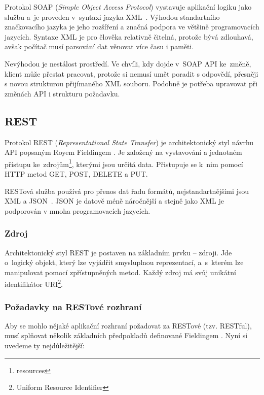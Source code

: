 Protokol SOAP (\textit{Simple Object Access Protocol}) vystavuje aplikační logiku jako službu
a~je proveden v~syntaxi jazyka XML~\cite{xml}. Výhodou standartního značkovacího jazyka je jeho rozšíření
a značná podpora ve většině programovacích jazycích. Syntaxe XML je pro člověka relativně čitelná,
protože bývá zdlouhavá, avšak počítač musí parsování dat věnovat více času i paměti.

Nevýhodou je nestálost prostředí. Ve chvíli, kdy dojde v~SOAP API ke~změ\-ně, klient může přestat pracovat,
protože si nemusí umět poradit s odpovědí, přesněji s novou strukturou přijímaného XML souboru.
Podobně je potřeba upravovat při změnách API i strukturu požadavku.

 
\subsection{REST}

Protokol REST (\textit{Representational State Transfer}) je architektonický styl návrhu API popsaným Royem Fieldingem \cite{fielding}.
Je založený na vystavování a jednotném přístupu ke~zdrojům\footnote{resources}, kterými jsou určitá data.
Přistupuje se k~nim pomocí HTTP metod GET, POST, DELETE a PUT.

RESTová služba používá pro přenos dat řadu formátů, nejstandartnějšími jsou XML a JSON~\cite{json}.
JSON je datově méně náročnější a stejně jako XML je podporován v mnoha programovacích jazycích.

\subsubsection*{Zdroj}

Architektonický styl REST je postaven na základním prvku -- zdroji. Jde o~logický objekt,
který lze vyjádřit smysluplnou reprezentací, a~s~kterém lze manipulovat pomocí zpřístupněných metod.
Každý zdroj má svůj unikátní identifikátor URI\footnote{Uniform Resource Identifier}.

\subsubsection*{Požadavky na RESTové rozhraní}

Aby se mohlo nějaké aplikační rozhraní požadovat za RESTové (tzv. RESTful),
musí splňovat několik základních předpokladů definované Fieldingem \cite{fielding}.
Nyní si uvedeme ty nejdůležitější:

